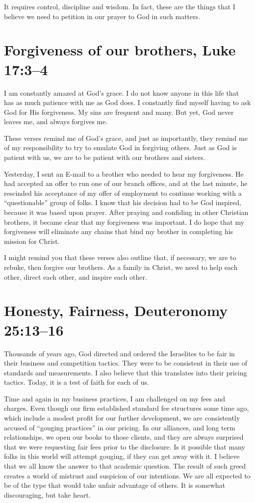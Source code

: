 \documentclass[12pt]{memoir}
\begin{document}
It requires control, discipline and wisdom. In fact, these are the
things that I believe we need to petition in our prayer to God in
such matters.

\section{Forgiveness of our brothers, Luke 17:3--4}

I am constantly amazed at God's grace. I do not know anyone in this
life that has as much patience with me as God does. I constantly find
myself having to ask God for His forgiveness. My sins are frequent
and many. But yet, God never leaves me, and always forgives me.

These verses remind me of God's grace, and just as importantly, they
remind me of my responsibility to try to emulate God in forgiving
others. Just as God is patient with us, we are to be patient with
our brothers and sisters.

Yesterday, I sent an E-mail to a brother who needed to hear my forgiveness.
He had accepted an offer to run one of our branch offices, and at
the last minute, he rescinded his acceptance of my offer of employment
to continue working with a ``questionable'' group of folks. I know
that his decision had to be God inspired, because it was based upon
prayer. After praying and confiding in other Christian brothers, it
became clear that my forgiveness was important. I do hope that my
forgiveness will eliminate any chains that bind my brother in completing
his mission for Christ.

I might remind you that these verses also outline that, if necessary,
we are to rebuke, then forgive our brothers. As a family in Christ,
we need to help each other, direct each other, and inspire each other.

\section{Honesty, Fairness, Deuteronomy 25:13--16}

Thousands of years ago, God directed and ordered the Israelites to
be fair in their business and competition tactics. They were to be
consistent in their use of standards and measurements. I also believe
that this translates into their pricing tactics. Today, it is a test
of faith for each of us.

Time and again in my business practices, I am challenged on my fees
and charges. Even though our firm established standard fee structures
some time ago, which include a modest profit for our further development,
we are consistently accused of ``gouging practices'' in our pricing.
In our alliances, and long term relationships, we open our books to
those clients, and they are always surprised that we were requesting
fair fees prior to the disclosure. Is it possible that many folks
in this world will attempt gouging, if they can get away with it.
I believe that we all know the answer to that academic question. The
result of such greed creates a world of mistrust and suspicion of
our intentions. We are all expected to be of the type that would take
unfair advantage of others. It is somewhat discouraging, but take
heart. 
\end{document}
